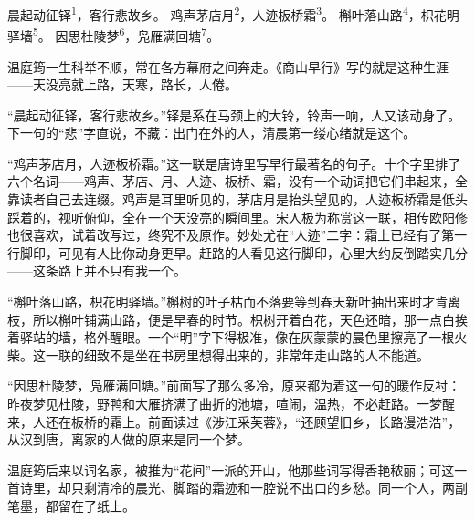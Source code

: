 
\begin{poem}
晨起动征铎\textsuperscript{1}，客行悲故乡。
鸡声茅店月\textsuperscript{2}，人迹板桥霜\textsuperscript{3}。
槲叶落山路\textsuperscript{4}，枳花明驿墙\textsuperscript{5}。
因思杜陵梦\textsuperscript{6}，凫雁满回塘\textsuperscript{7}。
\end{poem}

\begin{annotations}
\end{annotations}

\begin{appreciation}
温庭筠一生科举不顺，常在各方幕府之间奔走。《商山早行》写的就是这种生涯——天没亮就上路，天寒，路长，人倦。

“晨起动征铎，客行悲故乡。”铎是系在马颈上的大铃，铃声一响，人又该动身了。下一句的“悲”字直说，不藏：出门在外的人，清晨第一缕心绪就是这个。

“鸡声茅店月，人迹板桥霜。”这一联是唐诗里写早行最著名的句子。十个字里排了六个名词——鸡声、茅店、月、人迹、板桥、霜，没有一个动词把它们串起来，全靠读者自己去连缀。鸡声是耳里听见的，茅店月是抬头望见的，人迹板桥霜是低头踩着的，视听俯仰，全在一个天没亮的瞬间里。宋人极为称赏这一联，相传欧阳修也很喜欢，试着改写过，终究不及原作。妙处尤在“人迹”二字：霜上已经有了第一行脚印，可见有人比你动身更早。赶路的人看见这行脚印，心里大约反倒踏实几分——这条路上并不只有我一个。

“槲叶落山路，枳花明驿墙。”槲树的叶子枯而不落要等到春天新叶抽出来时才肯离枝，所以槲叶铺满山路，便是早春的时节。枳树开着白花，天色还暗，那一点白挨着驿站的墙，格外醒眼。一个“明”字下得极准，像在灰蒙蒙的晨色里擦亮了一根火柴。这一联的细致不是坐在书房里想得出来的，非常年走山路的人不能道。

“因思杜陵梦，凫雁满回塘。”前面写了那么多冷，原来都为着这一句的暖作反衬：昨夜梦见杜陵，野鸭和大雁挤满了曲折的池塘，喧闹，温热，不必赶路。一梦醒来，人还在板桥的霜上。前面读过《涉江采芙蓉》，“还顾望旧乡，长路漫浩浩”，从汉到唐，离家的人做的原来是同一个梦。

温庭筠后来以词名家，被推为“花间”一派的开山，他那些词写得香艳秾丽；可这一首诗里，却只剩清冷的晨光、脚踏的霜迹和一腔说不出口的乡愁。同一个人，两副笔墨，都留在了纸上。
\end{appreciation}
